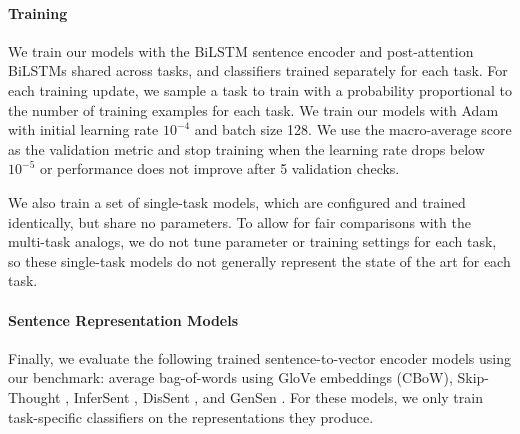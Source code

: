 \paragraph{Training}

We train our models with the BiLSTM sentence encoder and post-attention BiLSTMs shared across tasks, and classifiers trained separately for each task.
For each training update, we sample a task to train with a probability proportional to the number of training examples for each task.
We train our models with Adam \citep{kingma2014adam} with initial learning rate $10^{-4}$ and batch size 128.
We use the macro-average score as the validation metric and stop training when the learning rate drops below $10^{-5}$ or performance does not improve after 5 validation checks.

We also train a set of single-task models, which are configured and trained identically, but share no parameters. To allow for fair comparisons with the multi-task analogs, we do not tune parameter or training settings for each task, so these single-task models do not generally represent the state of the art for each task.
 
\paragraph{Sentence Representation Models}

Finally, we evaluate the following trained sentence-to-vector encoder models using our benchmark: average bag-of-words using GloVe embeddings (CBoW), Skip-Thought \citep{kiros2015skip}, InferSent \citep{DBLP:conf/emnlp/ConneauKSBB17}, DisSent \citep{nie2017dissent}, and GenSen \citep{subramanian2018large}. 
For these models, we only train task-specific classifiers on the representations they produce. 

